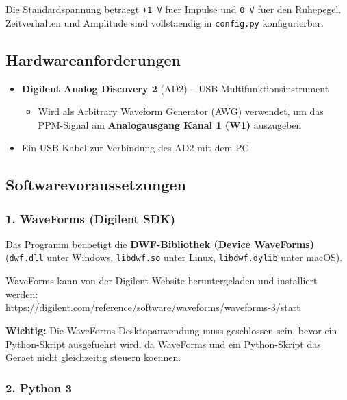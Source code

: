 Die Standardspannung betraegt \texttt{+1 V} fuer Impulse und \texttt{0 V}
fuer den Ruhepegel. Zeitverhalten und Amplitude sind vollstaendig in
\texttt{config.py} konfigurierbar.

\subsection*{Hardwareanforderungen}

\begin{itemize}
  \item \textbf{Digilent Analog Discovery 2} (AD2) -- USB-Multifunktionsinstrument
  \begin{itemize}
    \item Wird als Arbitrary Waveform Generator (AWG) verwendet, um das
          PPM-Signal am \textbf{Analogausgang Kanal 1 (W1)} auszugeben
  \end{itemize}
  \item Ein USB-Kabel zur Verbindung des AD2 mit dem PC
\end{itemize}

\subsection*{Softwarevoraussetzungen}

\subsubsection*{1. WaveForms (Digilent SDK)}

Das Programm benoetigt die \textbf{DWF-Bibliothek (Device WaveForms)}
(\texttt{dwf.dll} unter Windows, \texttt{libdwf.so} unter Linux,
\texttt{libdwf.dylib} unter macOS).

WaveForms kann von der Digilent-Website heruntergeladen und installiert werden:\\
\url{https://digilent.com/reference/software/waveforms/waveforms-3/start}

\textbf{Wichtig:} Die WaveForms-Desktopanwendung muss geschlossen sein, bevor
ein Python-Skript ausgefuehrt wird, da WaveForms und ein Python-Skript das
Geraet nicht gleichzeitig steuern koennen.

\subsubsection*{2. Python 3}

